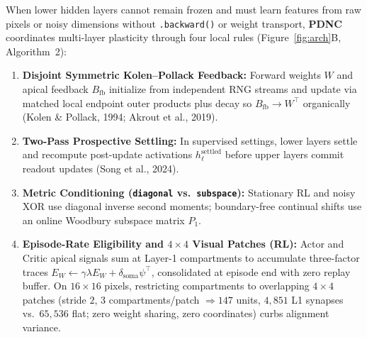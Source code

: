\documentclass[11pt,a4paper]{article}
\begin{document}
When lower hidden layers cannot remain frozen and must learn features from raw pixels or noisy dimensions without \texttt{.backward()} or weight transport, \textbf{PDNC} coordinates multi-layer plasticity through four local rules (Figure~\ref{fig:arch}B, Algorithm~2):
\begin{enumerate}
    \item \textbf{Disjoint Symmetric Kolen--Pollack Feedback:} Forward weights $W$ and apical feedback $B_{\text{fb}}$ initialize from independent RNG streams and update via matched local endpoint outer products plus decay so $B_{\text{fb}} \to W^\top$ organically (Kolen \& Pollack, 1994; Akrout et al., 2019).
    \item \textbf{Two-Pass Prospective Settling:} In supervised settings, lower layers settle and recompute post-update activations $h_\ell^{\text{settled}}$ before upper layers commit readout updates (Song et al., 2024).
    \item \textbf{Metric Conditioning (\texttt{diagonal} vs.\ \texttt{subspace}):} Stationary RL and noisy XOR use diagonal inverse second moments; boundary-free continual shifts use an online Woodbury subspace matrix $P_1$.
    \item \textbf{Episode-Rate Eligibility and $4\times 4$ Visual Patches (RL):} Actor and Critic apical signals sum at Layer-1 compartments to accumulate three-factor traces $E_W \leftarrow \gamma\lambda E_W + \delta_{\text{soma}}\psi^\top$, consolidated at episode end with zero replay buffer. On $16\times 16$ pixels, restricting compartments to overlapping $4\times 4$ patches (stride $2$, $3$ compartments/patch $\Rightarrow 147$ units, $4{,}851$ L1 synapses vs.\ $65{,}536$ flat; zero weight sharing, zero coordinates) curbs alignment variance.
\end{enumerate}

\noindent{}
\end{document}
